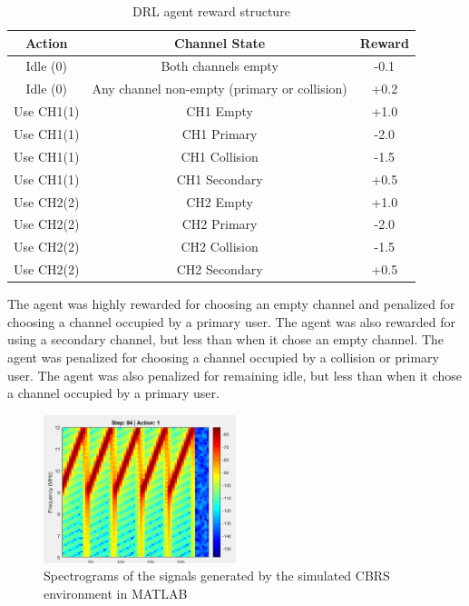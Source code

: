 \begin{table}[ht]
    \centering
    \caption{DRL agent reward structure}
    \begin{tabular}{| c | c | c|}
    \hline
    \textbf{Action} & \textbf{Channel State} & \textbf{Reward} \\
    \hline
    Idle (0) & Both channels empty & -0.1 \\
    Idle (0) & Any channel non-empty (primary or collision) & +0.2 \\
    Use CH1(1) & CH1 Empty & +1.0 \\
    Use CH1(1) & CH1 Primary & -2.0  \\
    Use CH1(1) & CH1 Collision  & -1.5  \\
    Use CH1(1) & CH1 Secondary & +0.5 \\ 
    Use CH2(2) & CH2 Empty & +1.0  \\ 
    Use CH2(2) & CH2 Primary & -2.0  \\
    Use CH2(2) & CH2 Collision & -1.5  \\
    Use CH2(2) & CH2 Secondary & +0.5  \\
    
    \hline
    \end{tabular}
    \label{tab:scenario_labels}
\end{table}
    
    The agent was highly rewarded for choosing an empty channel and penalized for choosing a channel occupied by a primary user. The agent was also rewarded for using a secondary channel, but less than when it chose an empty channel. The agent was penalized for choosing a channel occupied by a collision or primary user. The agent was also penalized for remaining idle, but less than when it chose a channel occupied by a primary user.

\begin{figure}[h]
    \includegraphics[width=0.5\textwidth]{figures/matlab_simulation.png}
    \centering
    \caption{ Spectrograms of the signals generated by the simulated CBRS environment in MATLAB}
    \centering
\end{figure}
    
